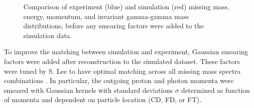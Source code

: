 \begin{figure}[hbt]
	\caption[Simulation and Experiment Matching before Smearing]{Comparison of experiment (blue) and simulation (red) missing mass, energy, momentum, and invariant gamma-gamma mass distributions, before any smearing factors were added to the simulation data.}
	\label{fig:bad}
\end{figure}


To improve the matching between simulation and experiment, Gaussian smearing factors were added after reconstruction to the simulated dataset. These factors were tuned by S. Lee \parencite{Lee2022MeasurementDetector} to have optimal matching across all missing mass spectra combinations . In particular, the outgoing proton and photon momenta were smeared with Gaussian kernels with standard deviations $\sigma$ determined as function of momenta and dependent on particle location (CD, FD, or FT).

